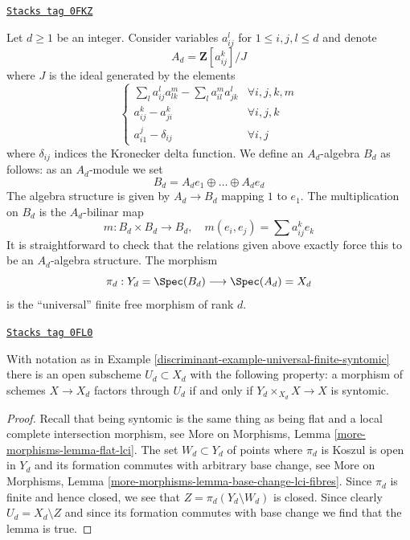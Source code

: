 \begin{example}
\label{discriminant-example-universal-finite-syntomic}
\href{https://stacks.math.columbia.edu/tag/0FKZ}{\texttt{Stacks tag 0FKZ}}

Let $d \geq 1$ be an integer. Consider variables
$a_{ij}^l$ for $1 \leq i, j, l \leq d$ and denote
$$
A_d = \mathbf{Z}[a_{ij}^k]/J
$$
where $J$ is the ideal generated by the elements
$$
\left\{
\begin{matrix}
\sum_l a_{ij}^la_{lk}^m - \sum_l a_{il}^ma_{jk}^l & \forall i, j, k, m \\
a_{ij}^k - a_{ji}^k & \forall i, j, k \\
a_{i1}^j - \delta_{ij} & \forall i, j
\end{matrix}
\right.
$$
where $\delta_{ij}$ indices the Kronecker delta function.
We define an $A_d$-algebra $B_d$ as follows: as an $A_d$-module we set
$$
B_d = A_d e_1 \oplus \ldots \oplus A_d e_d
$$
The algebra structure is given by $A_d \to B_d$ mapping $1$ to $e_1$.
The multiplication on $B_d$ is the $A_d$-bilinar map
$$
m : B_d \times B_d \longrightarrow B_d, \quad
m(e_i, e_j) = \sum a_{ij}^k e_k
$$
It is straightforward to check that the relations given above
exactly force this to be an $A_d$-algebra structure.
The morphism
$$
\pi_d : Y_d = \Spec(B_d) \longrightarrow \Spec(A_d) = X_d
$$
is the ``universal'' finite free morphism of rank $d$.
\end{example}

\begin{lemma}
\label{discriminant-lemma-universal-finite-syntomic}
\href{https://stacks.math.columbia.edu/tag/0FL0}{\texttt{Stacks tag 0FL0}}

With notation as in Example \ref{discriminant-example-universal-finite-syntomic}
there is an open subscheme $U_d \subset X_d$ with the following property:
a morphism of schemes $X \to X_d$ factors through $U_d$ if and only
if $Y_d \times_{X_d} X \to X$ is syntomic.
\end{lemma}

\begin{proof}
Recall that being syntomic is the same thing as being flat and
a local complete intersection morphism, see
More on Morphisms, Lemma \ref{more-morphisms-lemma-flat-lci}.
The set $W_d \subset Y_d$ of points where $\pi_d$ is Koszul
is open in $Y_d$ and its formation commutes with arbitrary base change, see
More on Morphisms, Lemma \ref{more-morphisms-lemma-base-change-lci-fibres}.
Since $\pi_d$ is finite and hence closed, we see that
$Z = \pi_d(Y_d \setminus W_d)$ is closed. Since clearly $U_d = X_d \setminus Z$
and since its formation commutes with base change we find that the lemma
is true.
\end{proof}

